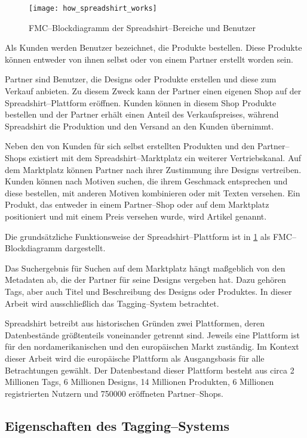 \begin{figure}[t]
\centering
\texttt{[image: how\_spreadshirt\_works]}
\caption{FMC--Blockdiagramm der Spreadshirt--Bereiche und Benutzer}
\label{fig:howspreadshirtworks}
\end{figure}

Als Kunden werden Benutzer bezeichnet, die Produkte bestellen. Diese Produkte können entweder von ihnen selbst oder von einem Partner erstellt worden sein. 

Partner sind Benutzer, die Designs oder Produkte erstellen und diese zum Verkauf anbieten. Zu diesem Zweck kann der Partner einen eigenen Shop auf der Spreadshirt--Plattform eröffnen. Kunden können in diesem Shop Produkte bestellen und der Partner erhält einen Anteil des Verkaufspreises, während Spreadshirt die Produktion und den Versand an den Kunden übernimmt.

Neben den von Kunden für sich selbst erstellten Produkten und den Partner--Shops existiert mit dem Spreadshirt--Marktplatz ein weiterer Vertriebskanal. Auf dem Marktplatz können Partner nach ihrer Zustimmung ihre Designs vertreiben. Kunden können nach Motiven suchen, die ihrem Geschmack entsprechen und diese bestellen, mit anderen Motiven kombinieren oder mit Texten versehen. Ein Produkt, das entweder in einem Partner--Shop oder auf dem Marktplatz positioniert und mit einem Preis versehen wurde, wird Artikel genannt.

Die grundsätzliche Funktionsweise der Spreadshirt--Plattform ist in \cref{fig:howspreadshirtworks} als FMC--Blockdiagramm dargestellt.

Das Suchergebnis für Suchen auf dem Marktplatz hängt maßgeblich von den Metadaten ab, die der Partner für seine Designs vergeben hat. Dazu gehören Tags, aber auch Titel und Beschreibung des Designs oder Produktes. In dieser Arbeit wird ausschließlich das Tagging--System betrachtet.

\label{platforms}
Spreadshirt betreibt aus historischen Gründen zwei Plattformen, deren Datenbestände größtenteils voneinander getrennt sind. Jeweils eine Plattform ist für den nordamerikanischen und den europäischen Markt zuständig. Im Kontext dieser Arbeit wird die europäische Plattform als Ausgangsbasis für alle Betrachtungen gewählt. Der Datenbestand dieser Plattform besteht aus circa 2 Millionen Tags, 6 Millionen Designs, 14 Millionen Produkten, 6 Millionen registrierten Nutzern und \num{750000} eröffneten Partner--Shops.

\subsection{Eigenschaften des Tagging--Systems}
\label{tag_sprd}

